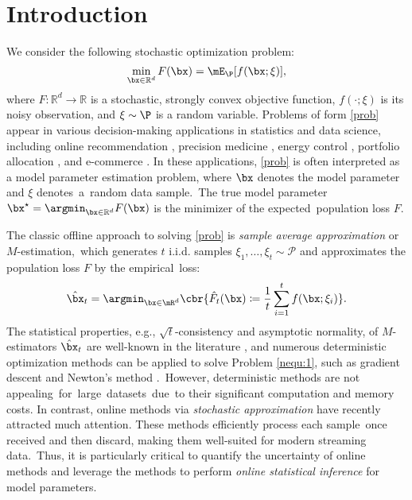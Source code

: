 
\section{Introduction}\label{sec:1}

We consider the following stochastic optimization problem:
\begin{equation}\label{prob}
\min_{\bx\in\mathbb{R}^d} F(\bx)=\mE_{\P}[f(\bx;\xi)],
\end{equation}
where $F: \mathbb{R}^d \rightarrow \mathbb{R}$ is a stochastic, strongly convex objective function, $f(\cdot;\xi)$ is its noisy observation, and $\xi \sim \P$ is a random variable.
Problems of form \eqref{prob} appear in various decision-making applications in statistics and data science, including online recommendation \citep{Li2010contextual}, precision medicine \citep{Kosorok2019Precision}, energy control \citep{Wallace2005Applications}, portfolio allocation \citep{Fan2012Vast}, and e-commerce  \citep{Chen2022Statistical}.
In these applications, \eqref{prob} is often interpreted as a model parameter estimation problem, where $\bx$ denotes the model parameter and $\xi$ denotes~a~random data sample.~The true model parameter $\bx^{\star} = \argmin_{\bx\in\mathbb{R}^d} F(\bx)$ is the minimizer of the expected~population loss $F$.



The classic offline approach to solving \eqref{prob} is \textit{sample average approximation} or $M$-estimation,~which generates $t$ i.i.d. samples $\xi_1,\dots,\xi_t\sim\mathcal{P}$ and approximates the population loss $F$ by the empirical~loss:
\begin{equation}\label{nequ:1}
\hat{\bx}_t = \argmin_{\bx\in \mR^d} \cbr{\hat{F}_t(\bx) \coloneqq \frac{1}{t}\sum_{i=1}^{t} f(\bx; \xi_i) }.
\end{equation} 
The statistical properties, e.g., $\sqrt{t}$-consistency and asymptotic normality, of $M$-estimators $\hat{\bx}_t$ are well-known in the literature \citep{Vaart1998Asymptotic, Hastie2009Elements}, and numerous deterministic optimization methods can be applied to solve Problem \eqref{nequ:1}, such as gradient descent and Newton's method \citep{Boyd2004Convex}.~However, deterministic methods are not appealing~for~large~datasets~due~to their significant computation and memory costs. In contrast, online methods via \textit{stochastic approximation} have recently attracted much attention. 
These methods efficiently process each sample~once received and then discard, making them well-suited for modern streaming data.~Thus, it is \mbox{particularly} critical to quantify the uncertainty of online methods and leverage the methods to perform \textit{online statistical inference} for model parameters.



